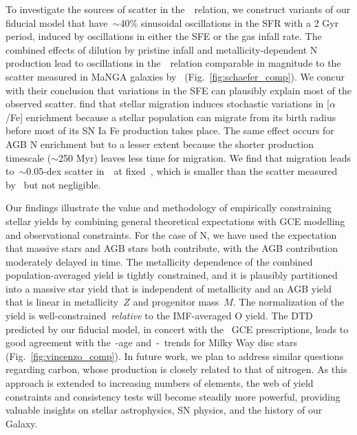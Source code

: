 \documentclass[ms.tex]{subfiles}
\begin{document}
\par
To investigate the sources of scatter in the~\ohno~relation, we construct
variants of our fiducial model that have~$\sim$40\% sinusoidal oscillations in
the SFR with a 2 Gyr period, induced by oscillations in either the SFE or the
gas infall rate.
The combined effects of dilution by pristine infall and metallicity-dependent N
production lead to oscillations in the~\ohno~relation comparable in magnitude
to the scatter measured in MaNGA galaxies by~\citet{Schaefer2020}
(Fig.~\ref{fig:schaefer_comp}).
We concur with their conclusion that variations in the SFE can plausibly
explain most of the observed scatter.
\citet{Johnson2021} find that stellar migration induces stochastic variations
in [$\alpha$/Fe] enrichment because a stellar population can migrate from its
birth radius before most of its SN Ia Fe production takes place.
The same effect occurs for AGB N enrichment but to a lesser extent because the
shorter production timescale ($\sim$250 Myr) leaves less time for migration.
We find that migration leads to~$\sim$0.05-dex scatter in~\no~at fixed~\oh,
which is smaller than the scatter measured by~\citet{Schaefer2020} but not
negligible.
\par
Our findings illustrate the value and methodology of empirically constraining
stellar yields by combining general theoretical expectations with GCE modelling
and observational constraints.
For the case of N, we have used the expectation that massive stars and AGB stars
both contribute, with the AGB contribution moderately delayed in time.
The metallicity dependence of the combined population-averaged yield is tightly
constrained, and it is plausibly partitioned into a massive star yield that is
independent of metallicity and an AGB yield that is linear in metallicity~$Z$
and progenitor mass~$M$.
The normalization of the yield is well-constrained~\textit{relative} to the
IMF-averaged O yield.
The DTD predicted by our fiducial model, in concert with the~\citet{Johnson2021}
GCE prescriptions, leads to good agreement with the~\no-age and~\no-\ofe~trends
for Milky Way disc stars (Fig.~\ref{fig:vincenzo_comp}).
{\color{red}
In future work, we plan to address similar questions regarding carbon, whose
production is closely related to that of nitrogen.
}
As this approach is extended to increasing numbers of elements, the web of
yield constraints and consistency tests will become steadily more powerful,
providing valuable insights on stellar astrophysics, SN physics, and the
history of our Galaxy.
\end{document}
